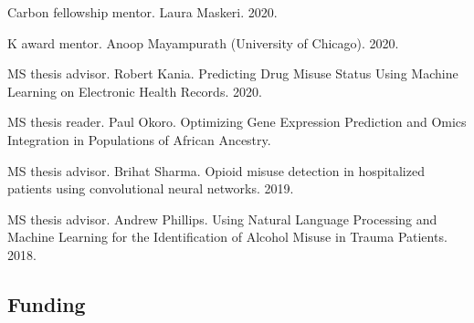 \documentclass[letterpaper]{article}
\renewenvironment{itemize}{
  \begin{list}{}{
    \setlength{\leftmargin}{1.5em}
  }
}{
  \end{list}
}
\begin{document}
\begin{itemize}
\item Carbon fellowship mentor. Laura Maskeri. 2020.
\item K award mentor. Anoop Mayampurath (University of Chicago). 2020.
\item MS thesis advisor. Robert Kania. Predicting Drug Misuse Status Using Machine Learning on Electronic Health Records. 2020.
\item MS thesis reader. Paul Okoro. Optimizing Gene Expression Prediction and Omics Integration in Populations of African Ancestry.
\item MS thesis advisor. Brihat Sharma. Opioid misuse detection in hospitalized patients using convolutional neural networks. 2019.
\item MS thesis advisor. Andrew Phillips. Using Natural Language Processing and Machine Learning for the Identification of Alcohol Misuse in Trauma Patients. 2018.
\end{itemize}

\subsection*{Funding}
\end{document}
